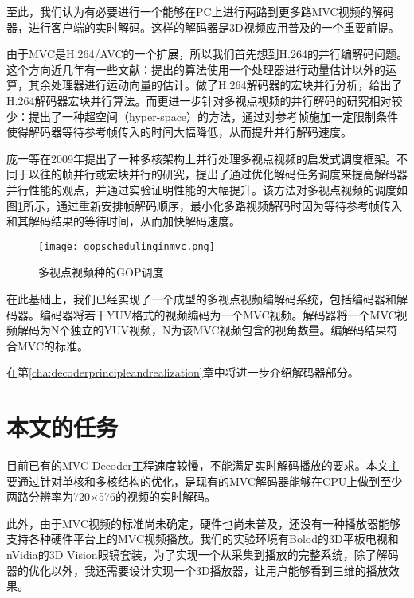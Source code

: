 至此，我们认为有必要进行一个能够在PC上进行两路到更多路MVC视频的解码器，进行客户端的实时解码。这样的解码器是3D视频应用普及的一个重要前提。

由于MVC是H.264/AVC的一个扩展，所以我们首先想到H.264的并行编解码问题。这个方向近几年有一些文献：提出的算法使用一个处理器进行动量估计以外的运算，其余处理器进行运动向量的估计。做了H.264解码器的宏块并行分析，给出了H.264解码器宏块并行算法。而更进一步针对多视点视频的并行解码的研究相对较少：提出了一种超空间（hyper-space）的方法，通过对参考帧施加一定限制条件使得解码器等待参考帧传入的时间大幅降低，从而提升并行解码速度。

庞一等在2009年提出了一种多核架构上并行处理多视点视频的启发式调度框架\cite{pang2009framework}。不同于以往的帧并行或宏块并行的研究，提出了通过优化解码任务调度来提高解码器并行性能的观点，并通过实验证明性能的大幅提升。该方法对多视点视频的调度如图\ref{fig:gopschedulinginmvc}所示，通过重新安排帧解码顺序，最小化多路视频解码时因为等待参考帧传入和其解码结果的等待时间，从而加快解码速度。
\begin{figure}[htbp]
\begin{center}
\texttt{[image: gopschedulinginmvc.png]}
\caption{多视点视频种的GOP调度}
\label{fig:gopschedulinginmvc}
\end{center}
\end{figure}


在此基础上，我们已经实现了一个成型的多视点视频编解码系统，包括编码器和解码器。编码器将若干YUV格式的视频编码为一个MVC视频。解码器将一个MVC视频解码为N个独立的YUV视频，N为该MVC视频包含的视角数量。编解码结果符合MVC的标准\cite{iso2009mvc}。

在第\ref{cha:decoderprincipleandrealization}章中将进一步介绍解码器部分。

\section{本文的任务}
\label{sec:workbrief}

目前已有的MVC Decoder工程速度较慢，不能满足实时解码播放的要求。本文主要通过针对单核和多核结构的优化，是现有的MVC解码器能够在CPU上做到至少两路分辨率为720$\times$576的视频的实时解码。

此外，由于MVC视频的标准尚未确定，硬件也尚未普及，还没有一种播放器能够支持各种硬件平台上的MVC视频播放。我们的实验环境有Bolod的3D平板电视和nVidia的3D Vision眼镜套装，为了实现一个从采集到播放的完整系统，除了解码器的优化以外，我还需要设计实现一个3D播放器，让用户能够看到三维的播放效果。

